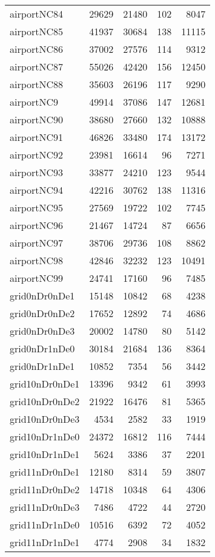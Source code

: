 \begin{tabular}{lrrrr}
airportNC84 & 29629 & 21480 & 102 & 8047 \\
airportNC85 & 41937 & 30684 & 138 & 11115 \\
airportNC86 & 37002 & 27576 & 114 & 9312 \\
airportNC87 & 55026 & 42420 & 156 & 12450 \\
airportNC88 & 35603 & 26196 & 117 & 9290 \\
airportNC9 & 49914 & 37086 & 147 & 12681 \\
airportNC90 & 38680 & 27660 & 132 & 10888 \\
airportNC91 & 46826 & 33480 & 174 & 13172 \\
airportNC92 & 23981 & 16614 & 96 & 7271 \\
airportNC93 & 33877 & 24210 & 123 & 9544 \\
airportNC94 & 42216 & 30762 & 138 & 11316 \\
airportNC95 & 27569 & 19722 & 102 & 7745 \\
airportNC96 & 21467 & 14724 & 87 & 6656 \\
airportNC97 & 38706 & 29736 & 108 & 8862 \\
airportNC98 & 42846 & 32232 & 123 & 10491 \\
airportNC99 & 24741 & 17160 & 96 & 7485 \\
grid0nDr0nDe1 & 15148 & 10842 & 68 & 4238 \\
grid0nDr0nDe2 & 17652 & 12892 & 74 & 4686 \\
grid0nDr0nDe3 & 20002 & 14780 & 80 & 5142 \\
grid0nDr1nDe0 & 30184 & 21684 & 136 & 8364 \\
grid0nDr1nDe1 & 10852 & 7354 & 56 & 3442 \\
grid10nDr0nDe1 & 13396 & 9342 & 61 & 3993 \\
grid10nDr0nDe2 & 21922 & 16476 & 81 & 5365 \\
grid10nDr0nDe3 & 4534 & 2582 & 33 & 1919 \\
grid10nDr1nDe0 & 24372 & 16812 & 116 & 7444 \\
grid10nDr1nDe1 & 5624 & 3386 & 37 & 2201 \\
grid11nDr0nDe1 & 12180 & 8314 & 59 & 3807 \\
grid11nDr0nDe2 & 14718 & 10348 & 64 & 4306 \\
grid11nDr0nDe3 & 7486 & 4722 & 44 & 2720 \\
grid11nDr1nDe0 & 10516 & 6392 & 72 & 4052 \\
grid11nDr1nDe1 & 4774 & 2908 & 34 & 1832 \\

\end{tabular}
